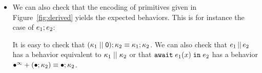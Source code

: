 \documentclass[9pt,preprint]{sigplanconf}
\begin{document}
\begin{itemize}
\item We can also check that the encoding of primitives given in Figure~\ref{fig:derived} yields the expected behaviors. This is for instance the case of $e_1 ; e_2$:
%
\par\nobreak{}%
It is easy to check that $(\kappa_1 \mid\mid \textsf{0}) ; \kappa_2  \equiv  \kappa_1 ; \kappa_2$.  We can also check that $e_1 \,||\, e_2$ has a behavior equivalent to $\kappa_1 \mid\mid \kappa_2$ or that $\mathtt{await}\; e_1(x) \;\mathtt{in}\; e_2$ has a behavior \mbox{$\bullet^\infty + (\bullet ; \kappa_2) \equiv \bullet ; \kappa_2$}. %


\end{itemize}
\end{document}
